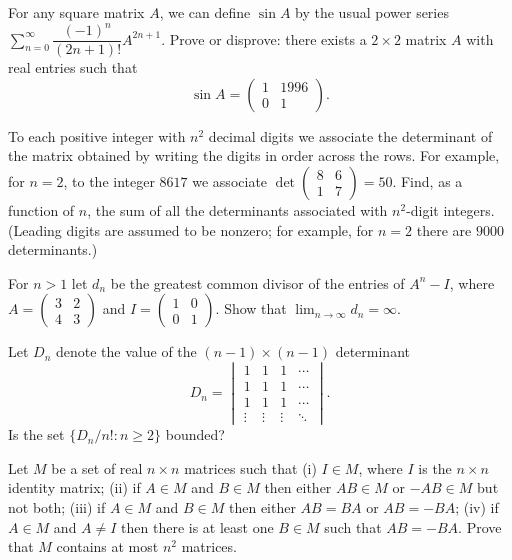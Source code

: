 \documentclass[12pt]{article}
\begin{document}
\begin{problems}
\item For any square matrix $A$, we can define $\sin A$ by the usual power series $\sum_{n=0}^\infty \dfrac{(-1)^n}{(2n+1)!}A^{2n+1}$. Prove or disprove: there exists a $2\times 2$ matrix $A$ with real entries such that
\[
\sin A = \begin{pmatrix}1 & 1996\\ 0 & 1\end{pmatrix}.
\]

\item To each positive integer with $n^2$ decimal digits we associate the determinant of the matrix obtained by writing the digits in order across the rows. For example, for $n=2$, to the integer $8617$ we associate $\det\begin{pmatrix}8 & 6\\ 1 & 7\end{pmatrix} = 50$. Find, as a function of $n$, the sum of all the determinants associated with $n^2$-digit integers. (Leading digits are assumed to be nonzero; for example, for $n=2$ there are $9000$ determinants.)

\item For $n>1$ let $d_n$ be the greatest common divisor of the entries of $A^n-I$, where $A=\begin{pmatrix}3 & 2\\ 4 & 3\end{pmatrix}$ and $I=\begin{pmatrix}1 & 0\\ 0 & 1\end{pmatrix}$. Show that $\lim_{n\to\infty} d_n = \infty$.

\item Let $D_n$ denote the value of the $(n-1)\times(n-1)$ determinant
\[
D_n = \begin{vmatrix} 1 & 1 & 1 & \cdots\\ 1 & 1 & 1 & \cdots\\ 1 & 1 & 1 & \cdots\\ \vdots & \vdots & \vdots & \ddots\end{vmatrix}.
\]
Is the set $\{D_n/n! : n\ge 2\}$ bounded?

\item Let $M$ be a set of real $n\times n$ matrices such that (i) $I\in M$, where $I$ is the $n\times n$ identity matrix; (ii) if $A\in M$ and $B\in M$ then either $AB\in M$ or $-AB\in M$ but not both; (iii) if $A\in M$ and $B\in M$ then either $AB=BA$ or $AB=-BA$; (iv) if $A\in M$ and $A\ne I$ then there is at least one $B\in M$ such that $AB=-BA$. Prove that $M$ contains at most $n^2$ matrices.


\end{problems}
\end{document}
